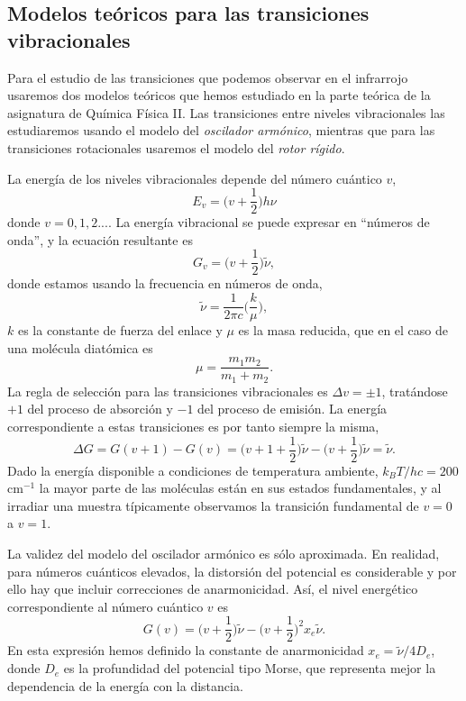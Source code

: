 \documentclass{tufte-book}
\begin{document}
\subsection{Modelos teóricos para las transiciones vibracionales}
Para el estudio de las transiciones que podemos observar en el infrarrojo
usaremos dos modelos teóricos que hemos estudiado en la parte teórica de la
asignatura de Química Física II. Las transiciones entre niveles vibracionales
las estudiaremos usando el modelo del \textit{oscilador armónico}, mientras 
que para las transiciones rotacionales usaremos el modelo del \textit{rotor
rígido}. 

La energía de los niveles vibracionales depende del número cuántico $v$,
\begin{equation}
    E_v=\bigg(v+\frac{1}{2}\bigg)h\nu
\end{equation}
donde $v=0,1,2...$. La energía vibracional se puede expresar en ``números
de onda'', y la ecuación resultante es
\begin{equation}
    G_v=\bigg(v+\frac{1}{2}\bigg)\tilde{\nu},
\end{equation}
donde estamos usando la frecuencia en números de onda,
\begin{equation}
    \tilde{\nu}=\frac{1}{2\pi c}\Big(\frac{k}{\mu}\Big),
\end{equation}
$k$ es la constante de fuerza del enlace y $\mu$ es la masa reducida,
que en el caso de una molécula diatómica es 
\begin{equation}
    \mu=\frac{m_1m_2}{m_1+m_2}.
\end{equation}
La regla de selección para las transiciones vibracionales es 
$\Delta v=\pm 1$, tratándose $+1$ del proceso de absorción 
y $-1$ del proceso de emisión. La energía correspondiente a
estas transiciones es por tanto siempre la misma, 
\begin{equation}
    \Delta G=G(v+1)-G(v) = \bigg(v+1+\frac{1}{2}\bigg)\tilde{\nu} -
     \bigg(v+\frac{1}{2}\bigg)\tilde{\nu} = \tilde{\nu}.
\end{equation}
Dado la energía disponible a condiciones de temperatura 
ambiente, $k_BT/hc=200$ cm$^{-1}$ la mayor parte de las 
moléculas están en sus estados fundamentales, y al irradiar
una muestra típicamente observamos la transición fundamental
de $v=0$ a $v=1$.

La validez del modelo del oscilador armónico es sólo aproximada.
En realidad, para números cuánticos elevados, la distorsión del
potencial es considerable y por ello hay que incluir correcciones
de anarmonicidad. Así, el nivel energético correspondiente al 
número cuántico $v$ es
\begin{equation}
    G(v) = \bigg(v+\frac{1}{2}\bigg)\tilde{\nu} - \bigg(v+\frac{1}{2}\bigg)^2x_e\tilde{\nu}.
\end{equation}
En esta expresión hemos definido la constante de anarmonicidad 
$x_e=\tilde{\nu}/4D_e$, donde $D_e$ es la profundidad del potencial
tipo Morse, que representa mejor la dependencia de la energía con
la distancia.
\end{document}
